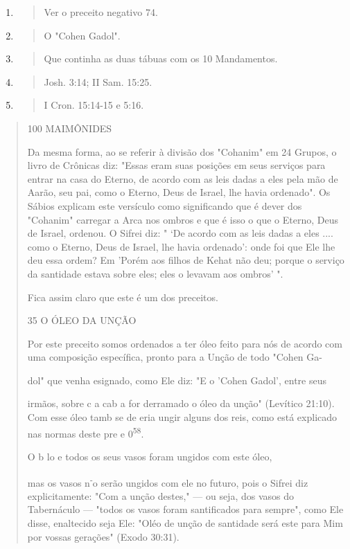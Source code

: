 \begin{enumerate}
\def\labelenumi{\arabic{enumi}.}
\setcounter{enumi}{52}
\item
  \begin{quote}
  Ver o preceito negativo 74.
  \end{quote}
\item
  \begin{quote}
  O "Cohen Gadol".
  \end{quote}
\item
  \begin{quote}
  Que continha as duas tábuas com os 10 Mandamentos.
  \end{quote}
\item
  \begin{quote}
  Josh. 3:14; II Sam. 15:25.
  \end{quote}
\item
  \begin{quote}
  I Cron. 15:14-15 e 5:16.
  \end{quote}
\end{enumerate}

\begin{quote}
100 MAIMÔNIDES

Da mesma forma, ao se referir à divisão dos "Cohanim" em 24 Gru­pos, o
livro de Crônicas diz: "Essas eram suas posições em seus serviços para
entrar na casa do Eterno, de acordo com as leis dadas a eles pela mão de
Aarão, seu pai, como o Eterno, Deus de Israel, lhe havia ordenado". Os
Sábios expli­cam este versículo como significando que é dever dos
"Cohanim" carregar a Arca nos ombros e que é isso o que o Eterno, Deus
de Israel, ordenou. O Sifrei diz: " `De acordo com as leis dadas a eles
.... como o Eterno, Deus de Israel, lhe havia ordenado': onde foi que
Ele lhe deu essa ordem? Em 'Porém aos fi­lhos de Kehat não deu; porque o
serviço da santidade estava sobre eles; eles o levavam aos ombros' ".

Fica assim claro que este é um dos preceitos.

35 O ÓLEO DA UNÇÃO

Por este preceito somos ordenados a ter óleo feito para nós de acor­do
com uma composição específica, pronto para a Unção de todo "Cohen Ga-

dol" que venha esignado, como Ele diz: "E o 'Cohen Gadol', entre seus

irmãos, sobre c a cab a for derramado o óleo da unção" (Levítico 21:10).
Com esse óleo tamb se de eria ungir alguns dos reis, como está explicado
nas nor­mas deste pre e 0\textsuperscript{58}.

O b lo e todos os seus vasos foram ungidos com este óleo,

mas os vasos n\textsuperscript{-}o serão ungidos com ele no futuro, pois
o Sifrei diz explicita­mente: "Com a unção destes," --- ou seja, dos
vasos do Tabernáculo --- "todos os vasos foram santificados para
sempre", como Ele disse, enaltecido seja Ele: "Oléo de unção de
santidade será este para Mim por vossas gerações" (Exodo 30:31).
\end{quote}

